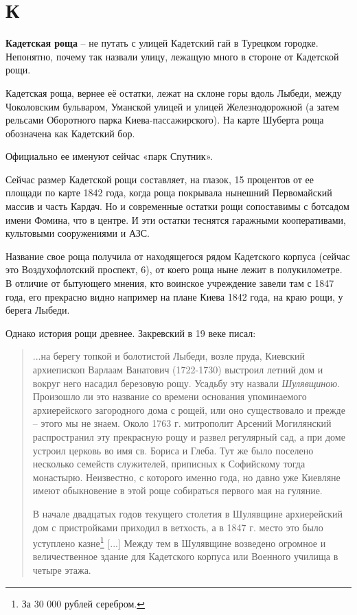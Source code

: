\chapter*{К}

\textbf{Кадетская роща} – не путать с улицей Кадетский гай в Турецком городке. Непонятно, почему так назвали улицу, лежащую много в стороне от Кадетской рощи.

Кадетская роща, вернее её остатки, лежат на склоне горы вдоль Лыбеди, между Чоколовским бульваром, Уманской улицей и улицей Железнодорожной (а затем рельсами Оборотного парка Киева-пассажирского). На карте Шуберта роща обозначена как Кадетский бор.

Официально ее именуют сейчас «парк Спутник».

Сейчас размер Кадетской рощи составляет, на глазок, 15 процентов от ее площади по карте 1842 года, когда роща покрывала нынешний Первомайский массив и часть Кардач. Но и современные остатки рощи сопоставимы с ботсадом имени Фомина, что в центре. И эти остатки теснятся гаражными кооперативами, культовыми сооружениями и АЗС.

Название свое роща получила от находящегося рядом Кадетского корпуса (сейчас это Воздухофлотский проспект, 6), от коего роща ныне лежит в полукилометре. В отличие от бытующего мнения, кто воинское учреждение завели там с 1847 года, его прекрасно видно например на плане Киева 1842 года, на краю рощи, у берега Лыбеди.

Однако история рощи древнее. Закревский в 19 веке писал:

\begin{quotation}
...на берегу топкой и болотистой Лыбеди, возле пруда, Киевский архиепископ Варлаам Ванатович (1722-1730) выстроил летний дом и вокруг него насадил березовую рощу. Усадьбу эту назвали \textit{Шулявщиною}. Произошло ли это название со времени основания упоминаемого архиерейского загородного дома с рощей, или оно существовало и прежде – этого мы не знаем. Около 1763 г. митрополит Арсений Могилянский распространил эту прекрасную рощу и развел регулярный сад, а при доме устроил церковь во имя св. Бориса и Глеба. Тут же было поселено несколько семейств служителей, приписных к Софийскому тогда монастырю. Неизвестно, с которого именно года, но давно уже Киевляне имеют обыкновение в этой роще собираться первого мая на гуляние.

В начале двадцатых годов текущего столетия в Шулявщине архиерейский дом с пристройками приходил в ветхость, а в 1847 г. место это было уступлено казне\footnote{За 30 000 рублей серебром.} [...] Между тем в Шулявщине возведено огромное и величественное здание для Кадетского корпуса или Военного училища в четыре этажа.
\end{quotation}

